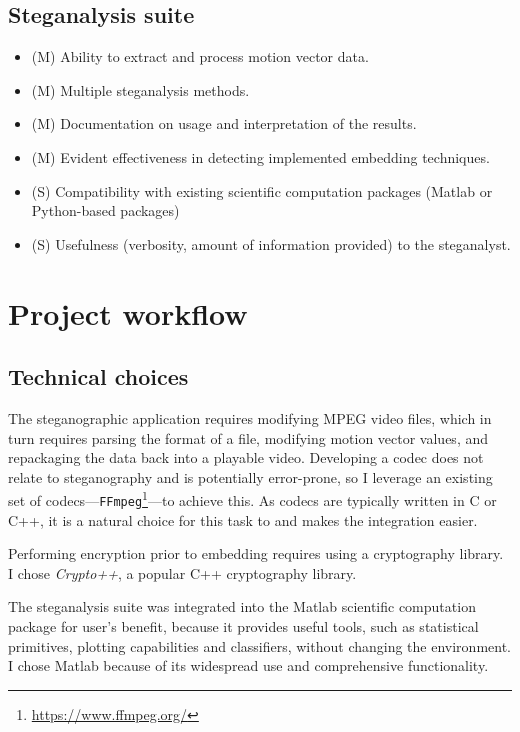 \documentclass[12pt,british,twoside,notitlepage,usenames,dvipsnames,hypens,final]{report}
\numberwithin{equation}{section}
\numberwithin{figure}{section}
\begin{document}
\subsection{Steganalysis suite}
\label{req-steg-suite}
\begin{itemize}
\item (M) Ability to extract and process motion vector data.
\item (M) Multiple steganalysis methods.
\item (M) Documentation on usage and interpretation of the results.
\item (M) Evident effectiveness in detecting implemented embedding techniques.
\item (S) Compatibility with existing scientific computation packages (Matlab or Python-based packages)
\item (S) Usefulness (verbosity, amount of information provided) to the steganalyst.
\end{itemize}

\section{Project workflow}

\subsection{Technical choices}
\label{tech-choices}

The steganographic application requires modifying MPEG video files, which in turn requires parsing the format of a file, modifying motion vector values, and repackaging the data back into a playable video. Developing a codec does not relate to steganography and is potentially error-prone, so I leverage an existing set of codecs---\texttt{FFmpeg}\footnote{\url{https://www.ffmpeg.org/}}---to achieve this. As codecs are typically written in C or C++, it is a natural choice for this task to and makes the integration easier.

Performing encryption prior to embedding requires using a cryptography library. I chose \emph{Crypto++}, a popular C++ cryptography library.

The steganalysis suite was integrated into the Matlab scientific computation package for user's benefit, because it provides useful tools, such as statistical primitives, plotting capabilities and classifiers, without changing the environment. I chose Matlab because of its widespread use and comprehensive functionality.
\end{document}
